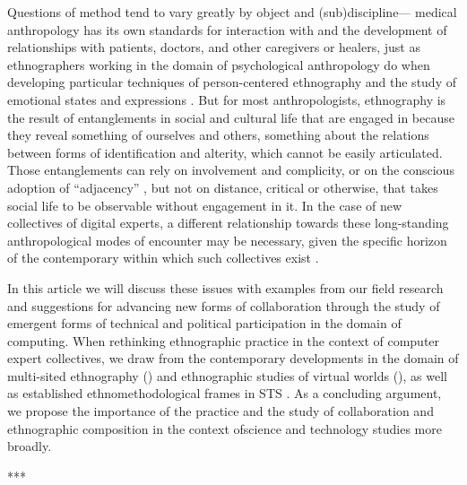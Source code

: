 \documentclass[10pt,letter,oneside]{scrartcl}
\begin{document}
Questions of method tend to vary greatly by object and
(sub)discipline--- medical anthropology has its own standards for
interaction with and the development of relationships with patients,
doctors, and other caregivers or healers, just as ethnographers
working in the domain of psychological anthropology do when developing
particular techniques of person-centered ethnography \cite{Hollan1998}
and the study of emotional states and expressions \cite{Throop2010}. 
But for most anthropologists, ethnography is the result of entanglements 
in social and cultural life that are engaged in because they reveal 
something of ourselves and others, something about the relations between
forms of identification and alterity, which cannot be easily articulated. 
Those entanglements can rely on involvement and complicity, or on the 
conscious adoption of ``adjacency'' \cite{Rabinow-MarkingTime}, but 
not on distance, critical or otherwise, that takes social life to be 
observable without engagement in it.  In the case of new collectives of 
digital experts, a different relationship towards these long-standing 
anthropological modes of encounter may be necessary, given the specific 
horizon of the contemporary within which such collectives exist \cite{Rabinow2008}.

In this article we will discuss these issues with examples from our
field research and suggestions for advancing new forms of
collaboration through the study of emergent forms of technical and
political participation in the domain of computing.  When rethinking
ethnographic practice in the context of computer expert collectives,
we draw from the contemporary developments in the domain of
multi-sited ethnography
(\cite{Fischer1999,Marcus1995,Falzonetal2009,Rabinow2008})
and ethnographic studies of virtual worlds
(\cite{BOELLSTORFF2008,Miller2001,Horst2012,boellstorff2012ethnography}),
as well as established ethnomethodological frames in STS
\cite{Forsythe1999,forsythe2001studying,Latour2007,Suchman1987,Suchman1999}.  
As a concluding argument, we propose the importance of the practice and the 
study of collaboration and ethnographic composition \cite{Kelty2008a} in the 
context ofscience and technology studies more broadly.

***
\end{document}
